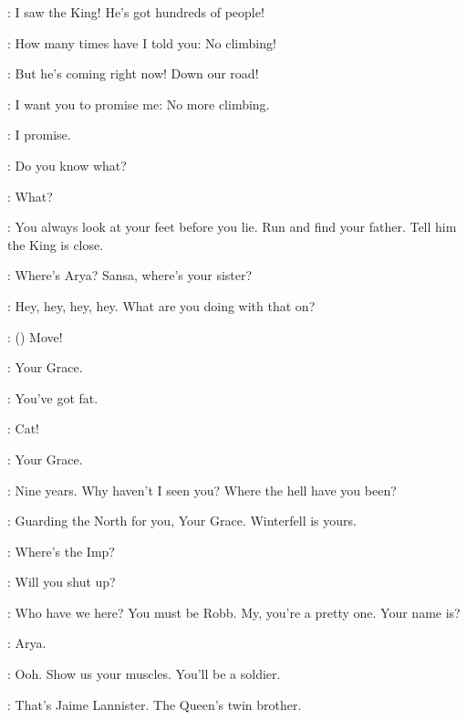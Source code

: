 \BRAN: I saw the King! He's got hundreds of people! 

\CATELYN: How many times have I told you: No climbing! 

\BRAN: But he's coming right now! Down our road! 

\CATELYN: I want you to promise me: No more climbing. 

\BRAN:  I promise. 

\CATELYN: Do you know what? 

\BRAN: What? 

\CATELYN: You always look at your feet before you lie. Run and find your father. Tell him the King is close. 


\CATELYN: Where's Arya? Sansa, where's your sister? 


\NED: Hey, hey, hey, hey. What are you doing with that on?  

\ARYA: () Move! 


\NED: Your Grace. 

\ROBERT: You've got fat. 


\ROBERT: Cat! 

\CATELYN: Your Grace. 

\ROBERT: Nine years. Why haven't I seen you? Where the hell have you been? 

\NED: Guarding the North for you, Your Grace. Winterfell is yours. 

\ARYA: Where's the Imp? 

\SANSA: Will you shut up? 

\ROBERT: Who have we here? You must be Robb.  My, you're a pretty one.  Your name is? 

\ARYA: Arya. 

\ROBERT:   Ooh. Show us your muscles. You'll be a soldier. 


\ARYA: That's Jaime Lannister. The Queen's twin brother. 

